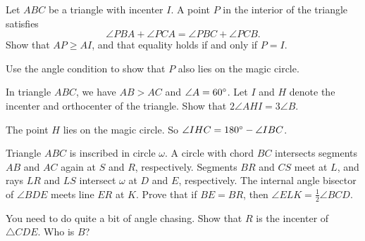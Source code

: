 \documentclass[11pt]{scrartcl}
\begin{document}
\begin{problem}
  [IMO 2006] Let $ABC$ be a triangle with incenter $I$.
  A point $P$ in the interior of the triangle satisfies \[\angle PBA+\angle PCA
  = \angle PBC+\angle PCB.\] Show that $AP \geq AI$, and that equality holds if and only if $P=I$.
  \begin{hint}
    Use the angle condition to show that $P$ also lies on the magic circle.
  \end{hint}
\end{problem}


\begin{problem}
  [APMO 2007] In triangle $ABC$, we have $AB > AC$ and $\angle A = 60^\circ$.
  Let $I$ and $H$ denote the incenter and orthocenter of the triangle.
  Show that $2\angle AHI = 3\angle B$.
  \begin{hint}
    The point $H$ lies on the magic circle.
    So $\angle IHC = 180^\circ - \angle IBC$.
  \end{hint}
\end{problem}

\begin{problem}
  Triangle $ABC$ is inscribed in circle $\omega$.
  A circle with chord $BC$ intersects segments $AB$ and $AC$ again at $S$ and $R$, respectively.
  Segments $BR$ and $CS$ meet at $L$, and rays $LR$ and $LS$ intersect $\omega$ at $D$ and $E$, respectively.
  The internal angle bisector of $\angle BDE$ meets line $ER$ at $K$.
  Prove that if $BE = BR$, then $\angle ELK = \tfrac{1}{2} \angle BCD$.
  \begin{hint}
    You need to do quite a bit of angle chasing.
    Show that $R$ is the incenter of $\triangle CDE$.
    Who is $B$?
  \end{hint}
\end{problem}
\end{document}
